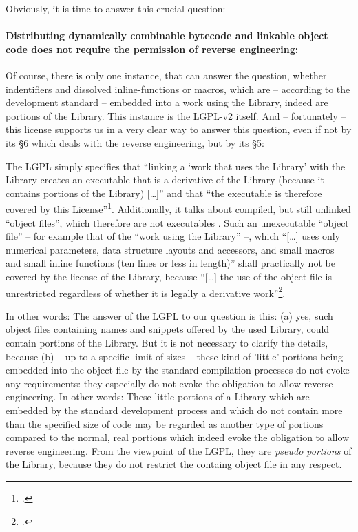Obviously, it is time to answer this crucial question:

\paragraph{Distributing dynamically combinable bytecode and linkable object code
does not require the permission of reverse engineering:} 

Of course, there is only one instance, that can answer the question, whether
indentifiers and dissolved inline-functions or macros, which are -- according to
the development standard -- embedded into a work using the Library, indeed are
portions of the Library. This instance is the LGPL-v2 itself. And -- fortunately
-- this license supports us in a very clear way to answer this question, even if
not by its §6 which deals with the reverse engineering, but by its §5:

The LGPL simply specifies that \enquote{linking a \enquote{work that uses the
Library} with the Library creates an executable that is a derivative of the
Library (because it contains portions of the Library) [\ldots]} and that
\enquote{the executable is therefore covered by this
License}\footcite[cf.][\nopage wp. §5]{Lgpl21OsiLicense1999a}. Additionally, it
talks about compiled, but still unlinked \enquote{object files}, which therefore
are not executables . Such an unexecutable \enquote{object file} -- for example
that of the \enquote{work using the Library} --, which \enquote{[\ldots] uses
only numerical parameters, data structure layouts and accessors, and small
macros and small inline functions (ten lines or less in length)} shall
practically not be covered by the license of the Library, because
\enquote{[\ldots] the use of the object file is unrestricted regardless of
whether it is legally a derivative work}\footcite[cf.][\nopage wp.
§5]{Lgpl21OsiLicense1999a}.

In other words: The answer of the LGPL to our question is this: (a) yes, such
object files containing names and snippets offered by the used Library, could
contain portions of the Library. But it is not necessary to clarify the details,
because (b) -- up to a specific limit of sizes -- these kind of 'little'
portions being embedded into the object file by the standard compilation
processes do not evoke any requirements: they especially do not evoke the
obligation to allow reverse engineering. In other words: These little portions
of a Library which are embedded by the standard development process and which do
not contain more than the specified size of code may be regarded as another type
of portions compared to the normal, real portions which indeed evoke the
obligation to allow reverse engineering. From the viewpoint of the LGPL, they
are \emph{pseudo portions} of the Library, because they do not restrict the
containg object file in any respect.

